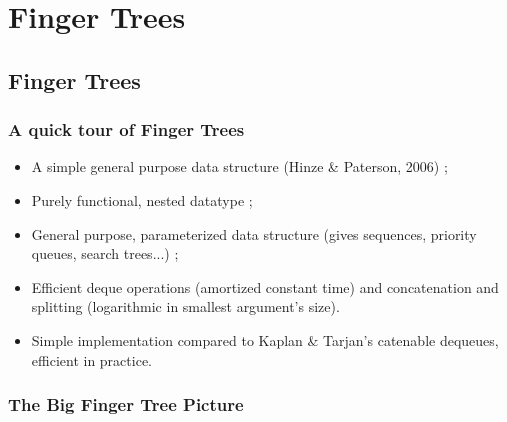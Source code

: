 \section{Finger Trees}

\subsection*{Finger Trees}
\begin{frame}
  \frametitle{A quick tour of Finger Trees}
  
  \begin{itemize}
  \item A simple general purpose data structure (Hinze \& Paterson, 2006) ;
  \item Purely functional, nested datatype ;
  \item General purpose, parameterized data structure (gives sequences,
    priority queues, search trees...) ;
  \item Efficient deque operations (amortized constant time) and
    concatenation and splitting (logarithmic in smallest argument's
    size).
  \item Simple implementation compared to Kaplan \& Tarjan's
    catenable dequeues, efficient in practice.
  \end{itemize}
  
\end{frame}

\begin{frame}
  \frametitle{The Big Finger Tree Picture}
\end{frame}


